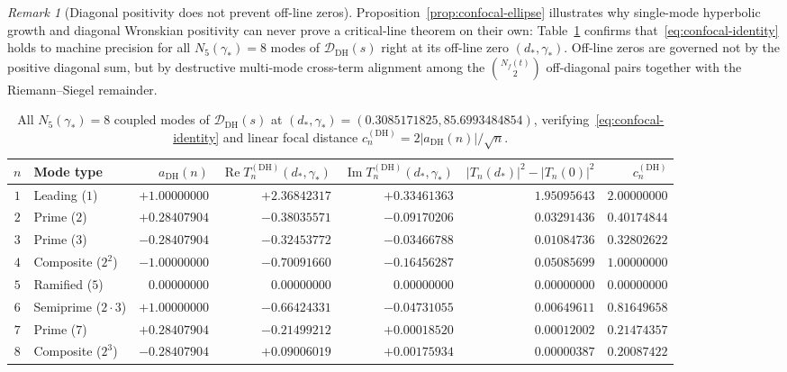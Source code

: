 \documentclass[11pt,reqno]{amsart}
\theoremstyle{definition}
\theoremstyle{remark}
\newtheorem{remark}[theorem]{Remark}
\numberwithin{equation}{section}
\DeclareMathOperator{\Reop}{Re}
\DeclareMathOperator{\Imop}{Im}
\begin{document}
\begin{remark}[Diagonal positivity does not prevent off-line zeros]
\label{rem:diagonal-warning}
Proposition~\ref{prop:confocal-ellipse} illustrates why single-mode hyperbolic growth and diagonal Wronskian positivity can never prove a critical-line theorem on their own: Table~\ref{tab:dh-8modes} confirms that~\eqref{eq:confocal-identity} holds to machine precision for all $N_5(\gamma_*)=8$ modes of $\mathcal{D}_{\mathrm{DH}}(s)$ right at its off-line zero $(d_*,\gamma_*)$. Off-line zeros are governed not by the positive diagonal sum, but by destructive multi-mode cross-term alignment among the $\binom{N_f(t)}{2}$ off-diagonal pairs together with the Riemann--Siegel remainder.
\end{remark}

\begin{table}[htbp]
\centering
\caption{All $N_5(\gamma_*) = 8$ coupled modes of $\mathcal{D}_{\mathrm{DH}}(s)$ at $(d_*, \gamma_*) = (0.3085171825, 85.6993484854)$, verifying~\eqref{eq:confocal-identity} and linear focal distance $c_n^{(\mathrm{DH})} = 2|a_{\mathrm{DH}}(n)|/\sqrt{n}$.}
\label{tab:dh-8modes}
{\footnotesize\setlength{\tabcolsep}{4pt}%
\begin{tabular}{@{}clrrrrr@{}}
\toprule
$n$ & Mode type & $a_{\mathrm{DH}}(n)$ & $\Reop T_n^{(\mathrm{DH})}(d_*,\gamma_*)$ & $\Imop T_n^{(\mathrm{DH})}(d_*,\gamma_*)$ & $|T_n(d_*)|^2 - |T_n(0)|^2$ & $c_n^{(\mathrm{DH})}$ \\
\midrule
$1$ & Leading ($1$) & $+1.00000000$ & $+2.36842317$ & $+0.33461363$ & $1.95095643$ & $2.00000000$ \\
$2$ & Prime ($2$) & $+0.28407904$ & $-0.38035571$ & $-0.09170206$ & $0.03291436$ & $0.40174844$ \\
$3$ & Prime ($3$) & $-0.28407904$ & $-0.32453772$ & $-0.03466788$ & $0.01084736$ & $0.32802622$ \\
$4$ & Composite ($2^2$) & $-1.00000000$ & $-0.70091660$ & $-0.16456287$ & $0.05085699$ & $1.00000000$ \\
$5$ & Ramified ($5$) & $0.00000000$ & $0.00000000$ & $0.00000000$ & $0.00000000$ & $0.00000000$ \\
$6$ & Semiprime ($2\cdot 3$) & $+1.00000000$ & $-0.66424331$ & $-0.04731055$ & $0.00649611$ & $0.81649658$ \\
$7$ & Prime ($7$) & $+0.28407904$ & $-0.21499212$ & $+0.00018520$ & $0.00012002$ & $0.21474357$ \\
$8$ & Composite ($2^3$) & $-0.28407904$ & $+0.09006019$ & $+0.00175934$ & $0.00000387$ & $0.20087422$ \\
\bottomrule
\end{tabular}%
}
\end{table}
\end{document}
